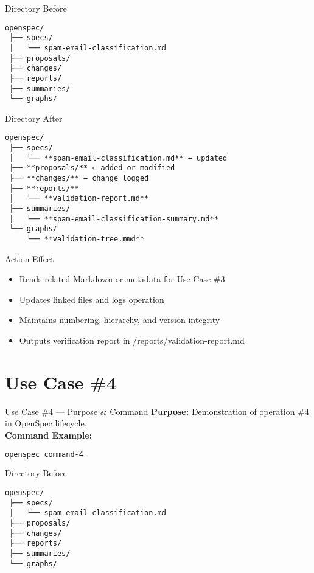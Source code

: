 \documentclass[aspectratio=169]{beamer}
\begin{document}
\begin{frame}{Directory Before}
\begin{lstlisting}
openspec/
 ├── specs/
 │   └── spam-email-classification.md
 ├── proposals/
 ├── changes/
 ├── reports/
 ├── summaries/
 └── graphs/
\end{lstlisting}
\end{frame}

\begin{frame}{Directory After}
\begin{lstlisting}
openspec/
 ├── specs/
 │   └── **spam-email-classification.md** ← updated
 ├── **proposals/** ← added or modified
 ├── **changes/** ← change logged
 ├── **reports/**
 │   └── **validation-report.md**
 ├── summaries/
 │   └── **spam-email-classification-summary.md**
 └── graphs/
     └── **validation-tree.mmd**
\end{lstlisting}
\end{frame}

\begin{frame}{Action Effect}
\begin{itemize}
  \item Reads related Markdown or metadata for Use Case \#3
  \item Updates linked files and logs operation
  \item Maintains numbering, hierarchy, and version integrity
  \item Outputs verification report in /reports/validation-report.md
\end{itemize}
\end{frame}

\section*{Use Case \#4}
\begin{frame}{Use Case \#4 --- Purpose \& Command}
\textbf{Purpose:} Demonstration of operation \#4 in OpenSpec lifecycle.\\[4pt]
\textbf{Command Example:}
\begin{lstlisting}[language=bash]
openspec command-4
\end{lstlisting}
\end{frame}

\begin{frame}{Directory Before}
\begin{lstlisting}
openspec/
 ├── specs/
 │   └── spam-email-classification.md
 ├── proposals/
 ├── changes/
 ├── reports/
 ├── summaries/
 └── graphs/
\end{lstlisting}
\end{frame}
\end{document}

